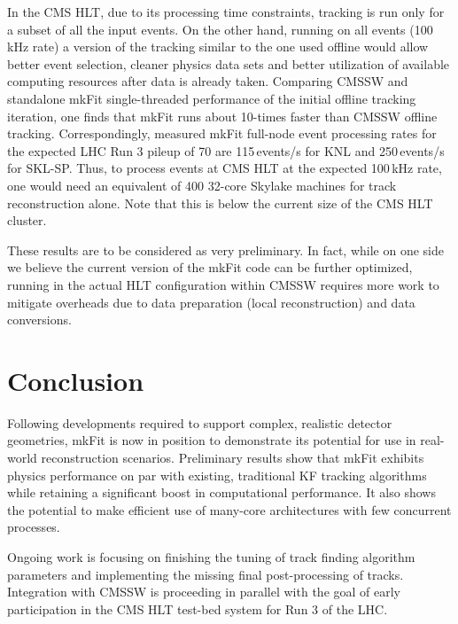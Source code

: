 \documentclass{webofc}
\def\mkfit{mkFit\xspace}
\begin{document}
In the CMS HLT, due to its processing time constraints, tracking is run only
for a subset of all the input events. On the other hand, running on all events
(100\,kHz rate) a version of the tracking similar to the one used offline
would allow better event selection, cleaner physics data sets and better
utilization of available computing resources after data is already
taken. Comparing CMSSW and standalone \mkfit single-threaded performance of
the initial offline tracking iteration, one finds that \mkfit runs about
10-times faster than CMSSW offline tracking. Correspondingly, measured \mkfit
full-node event processing rates for the expected LHC Run 3 pileup of 70 are
115\,events/s for KNL and 250\,events/s for SKL-SP. Thus, to process events at
CMS HLT at the expected 100\,kHz rate, one would need an equivalent of 400
32-core Skylake machines for track reconstruction alone. Note that this is
below the current size of the CMS HLT cluster.

These results are to be considered as very preliminary. In fact, while on one
side we believe the current version of the \mkfit code can be further
optimized, running in the actual HLT configuration within CMSSW requires more
work to mitigate overheads due to data preparation (local reconstruction) and
data conversions.

\section{Conclusion}

Following developments required to support complex, realistic detector
geometries, \mkfit is now in position to demonstrate its potential for use in
real-world reconstruction scenarios. Preliminary results show that \mkfit
exhibits physics performance on par with existing, traditional KF tracking
algorithms while retaining a significant boost in computational
performance. It also shows the potential to make efficient use of many-core
architectures with few concurrent processes.

Ongoing work is focusing on finishing the tuning of track finding algorithm
parameters and implementing the missing final post-processing of
tracks. Integration with CMSSW is proceeding in parallel with the goal of
early participation in the CMS HLT test-bed system for Run 3 of the LHC.


\end{document}
